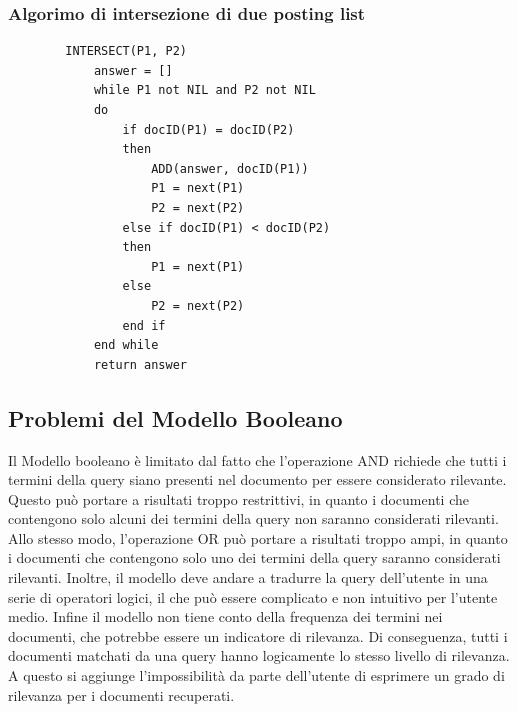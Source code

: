 \documentclass{report}
\begin{document}
	\subsubsection{Algorimo di intersezione di due posting list}
	\begin{lstlisting}
		INTERSECT(P1, P2)
			answer = []
			while P1 not NIL and P2 not NIL
			do
				if docID(P1) = docID(P2)
				then
					ADD(answer, docID(P1))
					P1 = next(P1)
					P2 = next(P2)
				else if docID(P1) < docID(P2)
				then
					P1 = next(P1)
				else
					P2 = next(P2)
				end if
			end while
			return answer
	\end{lstlisting}

	\subsection{Problemi del Modello Booleano}
	Il Modello booleano è limitato dal fatto che l'operazione AND richiede che tutti i termini della query siano presenti nel documento per essere considerato rilevante. Questo può portare a risultati troppo restrittivi, in quanto i documenti che contengono solo alcuni dei termini della query non saranno considerati rilevanti. Allo stesso modo, l'operazione OR può portare a risultati troppo ampi, in quanto i documenti che contengono solo uno dei termini della query saranno considerati rilevanti. Inoltre, il modello deve andare a tradurre la query dell'utente in una serie di operatori logici, il che può essere complicato e non intuitivo per l'utente medio. Infine il modello non tiene conto della frequenza dei termini nei documenti, che potrebbe essere un indicatore di rilevanza. Di conseguenza, tutti i documenti matchati da una query hanno logicamente lo stesso livello di rilevanza. A questo si aggiunge l'impossibilità da parte dell'utente di esprimere un grado di rilevanza per i documenti recuperati.
\end{document}
